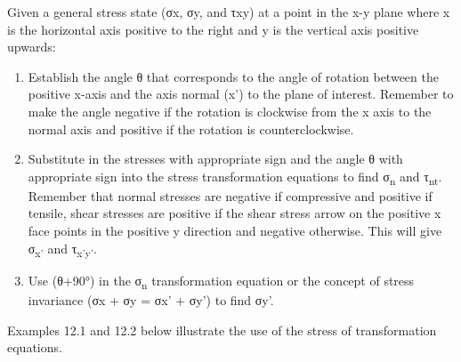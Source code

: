 \documentclass[
  letterpaper,
  DIV=11,
  numbers=noendperiod]{scrreprt}
\begin{document}
\begin{tcolorbox}[enhanced jigsaw, breakable, opacityback=0, toptitle=1mm, left=2mm, colback=white, opacitybacktitle=0.6, colframe=quarto-callout-note-color-frame, titlerule=0mm, arc=.35mm, leftrule=.75mm, bottomtitle=1mm, colbacktitle=quarto-callout-note-color!10!white, rightrule=.15mm, title={Step-by-step: Stress transformation}, bottomrule=.15mm, toprule=.15mm, coltitle=black]

Given a general stress state (σx, σy, and τxy) at a point in the x-y
plane where x is the horizontal axis positive to the right and y is the
vertical axis positive upwards:

\begin{enumerate}
\def\labelenumi{\arabic{enumi}.}
\item
  Establish the angle θ that corresponds to the angle of rotation
  between the positive x-axis and the axis normal (x') to the plane of
  interest. Remember to make the angle negative if the rotation is
  clockwise from the x axis to the normal axis and positive if the
  rotation is counterclockwise.
\item
  Substitute in the stresses with appropriate sign and the angle θ with
  appropriate sign into the stress transformation equations to find
  σ\textsubscript{n} and τ\textsubscript{nt}. Remember that normal
  stresses are negative if compressive and positive if tensile, shear
  stresses are positive if the shear stress arrow on the positive x face
  points in the positive y direction and negative otherwise. This will
  give σ\textsubscript{x'} and τ\textsubscript{x'y'}.
\item
  Use (θ+90°) in the σ\textsubscript{n} transformation equation or the
  concept of stress invariance (σx + σy = σx' + σy') to find σy'.
\end{enumerate}

\end{tcolorbox}

Examples 12.1 and 12.2 below illustrate the use of the stress of
transformation equations.
\end{document}
